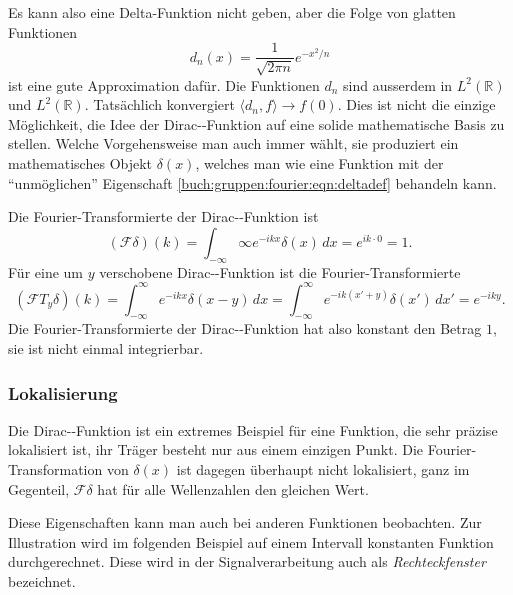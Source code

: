 Es kann also eine Delta-Funktion nicht geben, aber die Folge von
glatten Funktionen
\[
d_n(x) = \frac{1}{\!\sqrt{2\pi n}} e^{-x^2/n}
\]
ist eine gute Approximation dafür.
Die Funktionen $d_n$ sind ausserdem in $L^2(\mathbb{R})$ und
$L^2(\mathbb{R})$.
Tatsächlich konvergiert $\langle d_n,f\rangle \to f(0)$.
Dies ist nicht die einzige Möglichkeit, die Idee der 
Dirac-\textdelta-Funktion auf eine solide mathematische Basis zu
stellen.
Welche Vorgehensweise man auch immer wählt, sie produziert ein
mathematisches Objekt $\delta(x)$, welches man wie eine Funktion
mit der ``unmöglichen'' Eigenschaft
\eqref{buch:gruppen:fourier:eqn:deltadef}
behandeln kann.

Die Fourier-Transformierte der Dirac-\textdelta-Funktion ist
\[
(\mathscr{F}\delta)(k)
=
\int_{-\infty}\infty e^{-ikx}\delta(x)\,dx
=
e^{ik\cdot 0}
=
1.
\]
Für eine um $y$ verschobene Dirac-\textdelta-Funktion ist die
Fourier-Transformierte
\[
(\mathscr{F}T_y\delta)(k)
=
\int_{-\infty}^\infty e^{-ikx}\delta(x-y)\,dx
=
\int_{-\infty}^\infty e^{-ik(x'+y)}\delta(x')\,dx'
=
e^{-iky}.
\]
Die Fourier-Transformierte der Dirac-\textdelta-Funktion hat also 
konstant den Betrag $1$, sie ist nicht einmal integrierbar.

%
%
\subsubsection{Lokalisierung}
Die Dirac-\textdelta-Funktion ist ein extremes Beispiel für eine
Funktion, die sehr präzise lokalisiert ist, ihr Träger besteht nur
aus einem einzigen Punkt.
Die Fourier-Transformation von $\delta(x)$ ist dagegen überhaupt
nicht lokalisiert, ganz im Gegenteil, $\mathscr{F}\delta$ hat für alle
Wellenzahlen den gleichen Wert.

Diese Eigenschaften kann man auch bei anderen Funktionen beobachten.
Zur Illustration wird im folgenden Beispiel auf einem Intervall
konstanten Funktion durchgerechnet.
Diese wird in der Signalverarbeitung auch als {\em Rechteckfenster}
bezeichnet.


